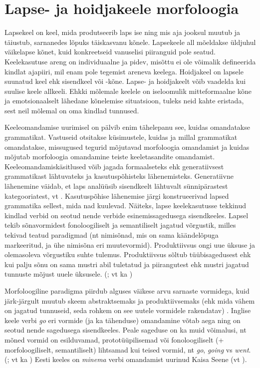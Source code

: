 \documentclass[12pt]{article}
\begin{document}
\newpage
\section{Lapse- ja hoidjakeele morfoloogia}

Lapsekeel on keel, mida produtseerib laps ise ning mis aja jooksul muutub ja täiustub, sarnanedes lõpuks täiskasvanu kõnele. Lapsekeele all mõeldakse üldjuhul väikelapse kõnet, kuid konkreetseid vanuselisi piiranguid pole seatud. Keelekasutuse areng on individuaalne ja pidev, misõttu ei ole võimalik defineerida kindlat ajapiiri, mil enam pole tegemist areneva keelega. Hoidjakeel on lapsele suunatud keel ehk sisendkeel või -kõne. Lapse- ja hoidjakeelt võib vaadelda kui suulise keele allkeeli. Ehkki mõlemale keelele on iseloomulik mitteformaalne kõne ja emotsionaalselt lähedane kõnelemise situatsioon, tuleks neid kahte eristada, sest neil mõlemal on oma kindlad tunnused. \citep[178--181]{Korgesaar}

Keeleomandamise uurimisel on pälvib enim tähelepanu see, kuidas omandatakse grammatikat. Vastuseid otsitakse küsimustele, kuidas ja millal grammatikat omandatakse, missugused tegurid mõjutavad morfoloogia omandamist ja kuidas mõjutab morfoloogia omandamine teiste keeletasandite omandamist. \citep[10]{ARGUSdiss} Keeleomandamiskäsitlused võib jagada formaalseteks ehk generatiivsest grammatikast lähtuvateks ja kasutuspõhisteks lähenemisteks. Generatiivne lähenemine väidab, et laps analüüsib sisendkeelt lähtuvalt sünnipärastest kategooriatest, vt \citep{Wexler}. Kasutuspõhise lähenemise järgi konstrueerivad lapsed grammatika sellest, mida nad kuulevad. Näiteks, lapse keelekasutusse tekkinud kindlad verbid on seotud nende verbide esinemissagedusega sisendkeeles. Lapsel tekib sõnavormidest fonoloogiliselt ja semantiliselt jagatud võrgustik, milles tekivad teatud paradigmad (nt nimisõnad, mis on sama käändelõpuga markeeritud, ja ühe nimisõna eri muutevormid). Produktiivsus ongi uue üksuse ja olemasoleva võrgustiku suhte tulemus. Produktiivsus sõltub tüübisagedusest ehk kui palju sõnu on sama mustri abil tuletatud ja piirangutest ehk mustri jagatud tunnuste mõjust uuele üksusele. (\citealp[2546--2547, 2550]{LIEVEN}; vt ka \citealp{Poola})

Morfoloogiline paradigma piirdub alguses väikese arvu sarnaste vormidega, kuid järk-järgult muutub skeem abstraktsemaks ja produktiivsemaks (ehk mida vähem on jagatud tunnuseid, seda rohkem on see uutele vormidele rakendatav) \citep[2549]{LIEVEN}. Inglise keele verbi \emph{go} eri vormide (ja ka tähenduse) omandamine võtab aega ning on seotud nende sagedusega sisendkeeles. Peale sageduse on ka muid võimalusi, nt mõned vormid on esilduvamad, prototüüpilisemad või fonoloogiliselt (+ morfoloogiliselt, semantiliselt) lihtsamad kui teised vormid, nt \emph{go}, \emph{going} vs \emph{went}. (\citealp{Theakston}; vt ka \citealp{Hispaania}) Eesti keeles on \emph{minema} verbi omandamist uurinud Kaisa Seene (vt \citealp{Seene}).
\end{document}
